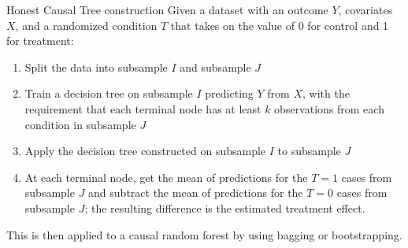 \documentclass[8pt]{beamer}
\begin{document}
\begin{frame}{Honest Causal Tree construction}
\label{honest_causal_tree}
Given a dataset with an outcome $Y$, covariates $X$, and a randomized condition $T$ that takes on the value of 0 for control and 1 for treatment:

\begin{enumerate}
\item Split the data into subsample $I$ and subsample $J$

\item Train a decision tree on subsample $I$ predicting $Y$ from $X$, with the requirement that each terminal node has at least $k$ observations from each condition in subsample $J$

\item Apply the decision tree constructed on subsample $I$ to subsample $J$

\item At each terminal node, get the mean of predictions for the $T = 1$ cases from subsample $J$ and subtract the mean of predictions for the $T = 0$ cases from subsample $J$; the resulting difference is the estimated treatment effect.

\end{enumerate}

This is then applied to a causal random forest by using bagging or bootstrapping.
\hyperlink{HTE}{}\\

\end{frame}
\end{document}
